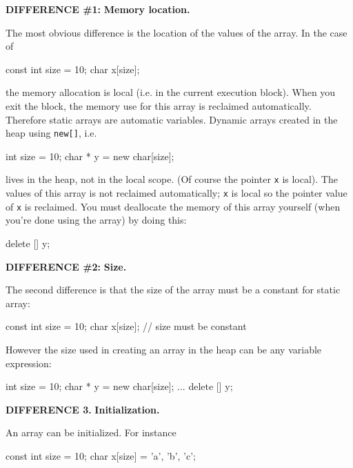 \textbf{DIFFERENCE \#1:} \textbf{Memory location.}

The most obvious difference is the location of the values of the array.
In the case of

\begin{consolethree}[escapeinside=||]
const int size = 10;
char x[size];
\end{consolethree}

the memory allocation is local (i.e. in the current execution block).
When you exit the block, the memory use for this array is reclaimed
automatically. Therefore static arrays are automatic variables. Dynamic
arrays created in the heap using \texttt{new[]}, i.e.

\begin{consolethree}[escapeinside=||]
int size = 10;
char * y = new char[size];
\end{consolethree}

lives in the heap, not in the local scope. (Of course the pointer
\texttt{x} is local). The values of this array is not reclaimed
automatically; \texttt{x} is local so the pointer value of \texttt{x} is
reclaimed. You must deallocate the memory of this array yourself (when
you're done using the array) by doing this:

\begin{consolethree}[escapeinside=||]
delete [] y;
\end{consolethree}

\textbf{DIFFERENCE \#2:} \textbf{Size.}

The second difference is that the size of the array must be a constant
for static array:

\begin{consolethree}[escapeinside=||]
const int size = 10;
char x[size]; // size must be constant
\end{consolethree}

However the size used in creating an array in the heap can be any
variable expression:

\begin{consolethree}[escapeinside=||]
int size = 10;
char * y = new char[size];
...
delete [] y;
\end{consolethree}

\textbf{DIFFERENCE 3.} \textbf{Initialization.}

An array can be initialized. For instance

\begin{consolethree}[escapeinside=||]
const int size = 10;
char x[size] = {'a', 'b', 'c'};
\end{consolethree}

